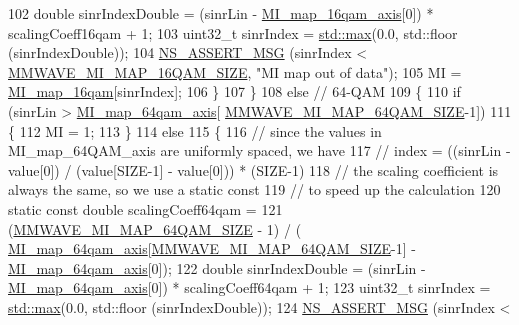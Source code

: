 \begin{DoxyCode}
102                   \textcolor{keywordtype}{double} sinrIndexDouble = (sinrLin -  \hyperlink{namespacens3_a57654bbd0e78a79e8e20a7af14abe6c4}{MI\_map\_16qam\_axis}[0]) * 
      scalingCoeff16qam + 1;
103                   uint32\_t sinrIndex = \hyperlink{80211b_8c_affe776513b24d84b39af8ab0930fef7f}{std::max}(0.0, std::floor (sinrIndexDouble));
104                   \hyperlink{assert_8h_aff5ece9066c74e681e74999856f08539}{NS\_ASSERT\_MSG} (sinrIndex < 
      \hyperlink{namespacens3_ae8c5f0c3c246a80749c417de3d0cbadc}{MMWAVE\_MI\_MAP\_16QAM\_SIZE}, \textcolor{stringliteral}{"MI map out of data"});
105                   MI = \hyperlink{namespacens3_aafdcfd17fee25ba8ea143f2b73d1791a}{MI\_map\_16qam}[sinrIndex];
106                 \}
107             \}
108           \textcolor{keywordflow}{else} \textcolor{comment}{// 64-QAM}
109             \{
110               \textcolor{keywordflow}{if} (sinrLin > \hyperlink{namespacens3_adbc6d60f5cb8deb6378e7e066a537238}{MI\_map\_64qam\_axis}[
      \hyperlink{namespacens3_a693bce071814cd94149a8f263633e038}{MMWAVE\_MI\_MAP\_64QAM\_SIZE}-1])
111                 \{
112                   MI = 1;
113                 \}
114               \textcolor{keywordflow}{else}
115                 \{
116                   \textcolor{comment}{// since the values in MI\_map\_64QAM\_axis are uniformly spaced, we have}
117                   \textcolor{comment}{// index = ((sinrLin - value[0]) / (value[SIZE-1] - value[0])) * (SIZE-1)}
118                   \textcolor{comment}{// the scaling coefficient is always the same, so we use a static const}
119                   \textcolor{comment}{// to speed up the calculation}
120                   \textcolor{keyword}{static} \textcolor{keyword}{const} \textcolor{keywordtype}{double} scalingCoeff64qam = 
121                     (\hyperlink{namespacens3_a693bce071814cd94149a8f263633e038}{MMWAVE\_MI\_MAP\_64QAM\_SIZE} - 1) / (
      \hyperlink{namespacens3_adbc6d60f5cb8deb6378e7e066a537238}{MI\_map\_64qam\_axis}[\hyperlink{namespacens3_a693bce071814cd94149a8f263633e038}{MMWAVE\_MI\_MAP\_64QAM\_SIZE}-1] - 
      \hyperlink{namespacens3_adbc6d60f5cb8deb6378e7e066a537238}{MI\_map\_64qam\_axis}[0]);
122                   \textcolor{keywordtype}{double} sinrIndexDouble = (sinrLin -  \hyperlink{namespacens3_adbc6d60f5cb8deb6378e7e066a537238}{MI\_map\_64qam\_axis}[0]) * 
      scalingCoeff64qam + 1;
123                   uint32\_t sinrIndex = \hyperlink{80211b_8c_affe776513b24d84b39af8ab0930fef7f}{std::max}(0.0, std::floor (sinrIndexDouble));
124                   \hyperlink{assert_8h_aff5ece9066c74e681e74999856f08539}{NS\_ASSERT\_MSG} (sinrIndex < 

\end{DoxyCode}
